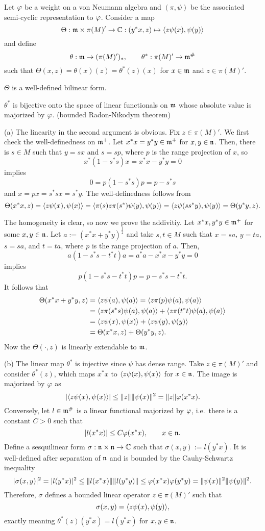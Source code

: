 \documentclass{../../../small}
\begin{document}
\begin{prop}
Let $\varphi$ be a weight on a von Neumann algebra and $(\pi,\psi)$ be the associated semi-cyclic representation to $\varphi$.
Consider a map
\[\Theta:\mathfrak{m}\times\pi(M)'\to\mathbb{C}:(y^*x,z)\mapsto\langle z\psi(x),\psi(y)\rangle\]
and define
\[\theta:\mathfrak{m}\to(\pi(M)')_*,\qquad\theta^*:\pi(M)'\to\mathfrak{m}^\#\]
such that $\Theta(x,z)=\theta(x)(z)=\theta^*(z)(x)$ for $x\in\mathfrak{m}$ and $z\in\pi(M)'$.
\begin{parts}
\item $\Theta$ is a well-defined bilinear form.
\item $\theta^*$ is bijective onto the space of linear functionals on $\mathfrak{m}$ whose absolute value is majorized by $\varphi$. (bounded Radon-Nikodym theorem)
\end{parts}
\end{prop}
\begin{pf}
(a)
The linearity in the second argument is obvious.
Fix $z\in\pi(M)'$.
We first check the well-definedness on $\mathfrak{m}^+$.
Let $x^*x=y^*y\in\mathfrak{m}^+$ for $x,y\in\mathfrak{n}$.
Then, there is $s\in M$ such that $y=sx$ and $s=sp$, where $p$ is the range projection of $x$, so
\[x^*(1-s^*s)x=x^*x-y^*y=0\]
implies
\[0=p(1-s^*s)p=p-s^*s\]
and $x=px=s^*sx=s^*y$.
The well-definedness follows from
\[\Theta(x^*x,z)=\langle z\psi(x),\psi(x)\rangle=\langle\pi(s)z\pi(s^*)\psi(y),\psi(y)\rangle=\langle z\psi(ss^*y),\psi(y)\rangle=\Theta(y^*y,z).\]

The homogeneity is clear, so now we prove the addivitiy.
Let $x^*x,y^*y\in\mathfrak{m}^+$ for some $x,y\in\mathfrak{n}$.
Let $a:=(x^*x+y^*y)^{\frac12}$ and take $s,t\in M$ such that $x=sa$, $y=ta$, $s=sa$, and $t=ta$, where $p$ is the range projection of $a$.
Then,
\[a(1-s^*s-t^*t)a=a^*a-x^*x-y^*y=0\]
implies
\[p(1-s^*s-t^*t)p=p-s^*s-t^*t.\]
It follows that
\begin{align*}
\Theta(x^*x+y^*y,z)
&=\langle z\psi(a),\psi(a)\rangle=\langle z\pi(p)\psi(a),\psi(a)\rangle\\
&=\langle z\pi(s^*s)\psi(a),\psi(a)\rangle+\langle z\pi(t^*t)\psi(a),\psi(a)\rangle\\
&=\langle z\psi(x),\psi(x)\rangle+\langle z\psi(y),\psi(y)\rangle\\
&=\Theta(x^*x,z)+\Theta(y^*y,z).
\end{align*}
Now the $\Theta(\cdot,z)$ is linearly extendable to $\mathfrak{m}$.

(b)
The linear map $\theta^*$ is injective since $\psi$ has dense range.
Take $z\in\pi(M)'$ and consider $\theta^*(z)$, which maps $x^*x$ to $\langle z\psi(x),\psi(x)\rangle$ for $x\in\mathfrak{n}$.
The image is majorized by $\varphi$ as
\[|\langle z\psi(x),\psi(x)\rangle|\le\|z\|\|\psi(x)\|^2=\|z\|\varphi(x^*x).\]
Conversely, let $l\in\mathfrak{m}^\#$ is a linear functional majorized by $\varphi$, i.e.~there is a constant $C>0$ such that
\[|l(x^*x)|\le C\varphi(x^*x),\qquad x\in\mathfrak{n}.\]
Define a sesquilinear form $\sigma:\mathfrak{n}\times\mathfrak{n}\to\mathbb{C}$ such that $\sigma(x,y):=l(y^*x)$.
It is well-defined after separation of $\mathfrak{n}$ and is bounded by the Cauhy-Schwartz inequality
\[|\sigma(x,y)|^2=|l(y^*x)|^2\le\|l(x^*x)\|\|l(y^*y)\|\le\varphi(x^*x)\varphi(y^*y)=\|\psi(x)\|^2\|\psi(y)\|^2.\]
Therefore, $\sigma$ defines a bounded linear operator $z\in\pi(M)'$ such that
\[\sigma(x,y)=\langle z\psi(x),\psi(y)\rangle,\]
exactly meaning $\theta^*(z)(y^*x)=l(y^*x)$ for $x,y\in\mathfrak{n}$.
\end{pf}
\end{document}
